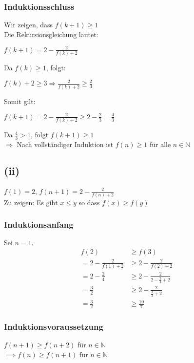 \documentclass{article}
\begin{document}
\subsubsection{Induktionsschluss}
Wir zeigen, dass $f(k+1) \geq 1$ \\
Die Rekursionsgleichung lautet:\\
\begin{center}
$f(k+1) = 2- \frac{2}{f(k)+2}$ \\
\end{center}
Da $f(k) \geq 1$, folgt: \\
\begin{center}
$f(k)+2 \geq 3 \Longrightarrow \frac{2}{f(k)+2} \geq \frac{2}{3}$ \\
\end{center}
Somit gilt: \\
\begin{center}
$f(k+1)=2-\frac{2}{f(k)+2} \geq 2-\frac{2}{3} = \frac{4}{3}$ \\
\end{center}
Da $\frac{4}{3}>1$, folgt $f(k+1) \geq 1$ \\

$\Longrightarrow$ Nach vollständiger Induktion ist $f(n) \geq 1$ für alle $n \in \mathbb{N}$


\subsection{(ii)}
$f(1) = 2$, $f(n+1) = 2 - \frac{2}{f(n)+2}$ \\
\newline
Zu zeigen: Es gibt $x \leq y$ so dass $f(x) \geq f(y)$
\subsubsection{Induktionsanfang}
Sei $n = 1$.
\begin{align*}
    f(2) &\geq f(3) \\
    = 2 - \frac{2}{f(1) + 2} &\geq 2 - \frac{2}{f(2) + 2} \\
    = 2 - \frac{2}{4} &\geq 2 - \frac{2}{2- \frac{2}{4} + 2} \\
    = \frac{3}{2} &\geq 2 - \frac{2}{\frac{3}{2} + 2} \\
    = \frac{3}{2} &\geq \frac{10}{7}
\end{align*}

\subsubsection{Induktionsvoraussetzung}
$f(n + 1) \geq f(n + 2)$ für $n \in \mathbb{N}$ \\
$\implies f(n) \geq f(n + 1)$ für $n \in \mathbb{N}$
\end{document}
